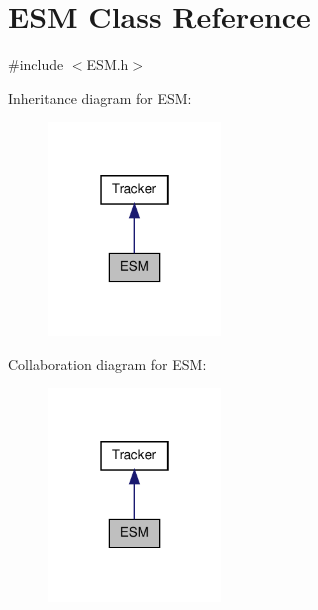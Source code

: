 \hypertarget{classESM}{\section{\-E\-S\-M \-Class \-Reference}
\label{classESM}
}


{\ttfamily \#include $<$\-E\-S\-M.\-h$>$}



\-Inheritance diagram for \-E\-S\-M\-:\nopagebreak
\begin{figure}[H]
\begin{center}
\leavevmode
\includegraphics[width=130pt]{classESM__inherit__graph}
\end{center}
\end{figure}


\-Collaboration diagram for \-E\-S\-M\-:\nopagebreak
\begin{figure}[H]
\begin{center}
\leavevmode
\includegraphics[width=130pt]{classESM__coll__graph}
\end{center}
\end{figure}
